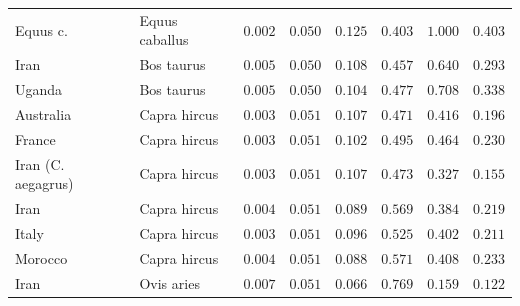 \documentclass{article}
\begin{document}
\begin{center}
\begin{longtable*}{|l|l|r|r|r|r|r|r|}
            \bottomrule
            \endlastfoot
            Equus c. &      Equus caballus &               $ 0.002$ &             $ 0.050$ &              $ 0.125$ &                                     $ 0.403$ &                       $ 1.000$ &                 $ 0.403$ \\
            Iran &          Bos taurus &               $ 0.005$ &             $ 0.050$ &              $ 0.108$ &                                     $ 0.457$ &                       $ 0.640$ &                 $ 0.293$ \\
            Uganda &          Bos taurus &               $ 0.005$ &             $ 0.050$ &              $ 0.104$ &                                     $ 0.477$ &                       $ 0.708$ &                 $ 0.338$ \\
            Australia &        Capra hircus &               $ 0.003$ &             $ 0.051$ &              $ 0.107$ &                                     $ 0.471$ &                       $ 0.416$ &                 $ 0.196$ \\
            France &        Capra hircus &               $ 0.003$ &             $ 0.051$ &              $ 0.102$ &                                     $ 0.495$ &                       $ 0.464$ &                 $ 0.230$ \\
            Iran (C. aegagrus) &        Capra hircus &               $ 0.003$ &             $ 0.051$ &              $ 0.107$ &                                     $ 0.473$ &                       $ 0.327$ &                 $ 0.155$ \\
            Iran &        Capra hircus &               $ 0.004$ &             $ 0.051$ &              $ 0.089$ &                                     $ 0.569$ &                       $ 0.384$ &                 $ 0.219$ \\
            Italy &        Capra hircus &               $ 0.003$ &             $ 0.051$ &              $ 0.096$ &                                     $ 0.525$ &                       $ 0.402$ &                 $ 0.211$ \\
            Morocco &        Capra hircus &               $ 0.004$ &             $ 0.051$ &              $ 0.088$ &                                     $ 0.571$ &                       $ 0.408$ &                 $ 0.233$ \\
            Iran &          Ovis aries &               $ 0.007$ &             $ 0.051$ &              $ 0.066$ &                                     $ 0.769$ &                       $ 0.159$ &                 $ 0.122$ \\

\end{longtable*}
\end{center}
\end{document}
